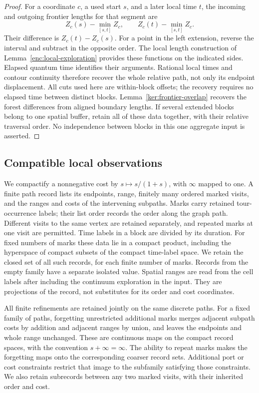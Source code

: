 \documentclass[11pt]{article}
\numberwithin{equation}{section}
\theoremstyle{definition}
\theoremstyle{remark}
\newcommand{\1}{\mathbf 1}
\begin{document}
\begin{proof}
For a coordinate $c$, a used start $s$, and a later local time $t$,
the incoming and outgoing frontier lengths for that segment are
\[
 Z_c(s)-\min_{[s,t]}Z_c,
 \qquad Z_c(t)-\min_{[s,t]}Z_c.
\]
Their difference is $Z_c(t)-Z_c(s)$.  For a point in the left
extension, reverse the interval and subtract in the opposite order.
The local length construction of Lemma~\ref{enc:local-exploration}
provides these functions on the indicated sides.  Elapsed quantum
time identifies their arguments.  Rational local times and contour
continuity therefore recover the whole relative path, not only its
endpoint displacement.  All cuts used here are within-block offsets;
the recovery requires no elapsed time between distinct blocks.
Lemma~\ref{ker:frontier-overlap} recovers the
forest differences from aligned boundary lengths.  If several
extended blocks belong to one spatial buffer, retain all of these
data together, with their relative traversal order.  No independence
between blocks in this one aggregate input is asserted.
\end{proof}

\subsection{Compatible local observations}

We compactify a nonnegative cost by \(s\mapsto s/(1+s)\), with
\(\infty\) mapped to one.  A finite path record lists its endpoints,
range, finitely many ordered marked visits, and the ranges and costs
of the intervening subpaths.  Marks carry retained tour-occurrence
labels; their list order records the order along the graph path.
Different visits to the same vertex are retained separately, and
repeated marks at one visit are permitted.  Time labels in a block
are divided by its duration.  For
fixed numbers of marks these data lie in a compact product, including
the hyperspace of compact subsets of the compact time-label space.
We retain the closed set of all such records, for each finite number
of marks.  Records from the empty family have a separate isolated
value.  Spatial ranges are read from the cell labels after including
the continuum exploration in the input.  They are projections of
the record, not substitutes for its order and cost coordinates.

All finite refinements are retained jointly on the same discrete
paths.  For a fixed family of paths, forgetting unrestricted
additional marks merges adjacent subpath costs by
addition and adjacent ranges by union, and leaves the endpoints and
whole range unchanged.  These are continuous maps on the compact
record spaces, with the convention $s+\infty=\infty$.
The ability to repeat marks makes the forgetting maps onto the
corresponding coarser record sets.  Additional port or cost constraints
restrict that image to the subfamily satisfying those constraints.
We also retain subrecords between
any two marked visits, with their inherited order and cost.
\end{document}

